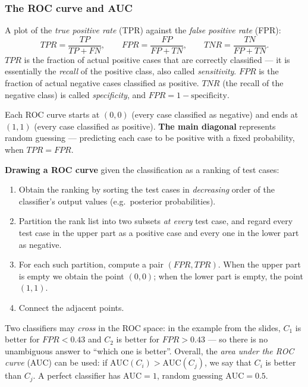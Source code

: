 \documentclass[11pt,a4paper]{article}
\theoremstyle{definition}
\providecommand{\uv}[1]{``#1''}
\begin{document}
\subsubsection{The ROC curve and AUC}

\begin{defbox}
A plot of the \emph{true positive rate} (TPR) against the \emph{false positive rate} (FPR):
\[ \mathit{TPR}=\frac{TP}{TP+FN},\qquad \mathit{FPR}=\frac{FP}{FP+TN},\qquad
   \mathit{TNR}=\frac{TN}{FP+TN}. \]
$\mathit{TPR}$ is the fraction of actual positive cases that are correctly classified --- it is
essentially the \emph{recall} of the positive class, also called \emph{sensitivity}.
$\mathit{FPR}$ is the fraction of actual negative cases classified as positive. $\mathit{TNR}$
(the recall of the negative class) is called \emph{specificity}, and
$\mathit{FPR}=1-\text{specificity}$.

Each ROC curve starts at $(0,0)$ (every case classified as negative) and ends at $(1,1)$ (every
case classified as positive). \textbf{The main diagonal} represents random guessing --- predicting
each case to be positive with a fixed probability, when $\mathit{TPR}=\mathit{FPR}$.
\end{defbox}

\textbf{Drawing a ROC curve} given the classification as a ranking of test cases:
\begin{enumerate}
\item Obtain the ranking by sorting the test cases in \emph{decreasing} order of the classifier's
      output values (e.g.\ posterior probabilities).
\item Partition the rank list into two subsets \emph{at every} test case, and regard every test case
      in the upper part as a positive case and every one in the lower part as negative.
\item For each such partition, compute a pair $(\mathit{FPR},\mathit{TPR})$. When the upper part is
      empty we obtain the point $(0,0)$; when the lower part is empty, the point $(1,1)$.
\item Connect the adjacent points.
\end{enumerate}

\begin{defbox}
Two classifiers may \emph{cross} in the ROC space: in the example from the slides, $C_1$ is better
for $\mathit{FPR}<0.43$ and $C_2$ is better for $\mathit{FPR}>0.43$ --- so there is no unambiguous
answer to \uv{which one is better}. Overall, the \emph{area under the ROC curve} (AUC) can be used:
if $\mathrm{AUC}(C_i)>\mathrm{AUC}(C_j)$, we say that $C_i$ is better than $C_j$. A perfect
classifier has $\mathrm{AUC}=1$, random guessing $\mathrm{AUC}=0.5$.
\end{defbox}
\end{document}
